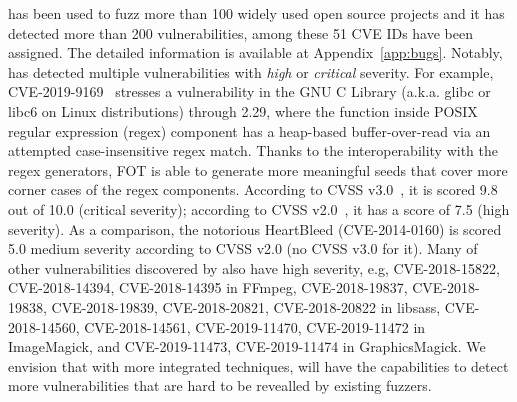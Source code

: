 {\FOT} has been used to fuzz more than 100 widely used open source projects and it has detected more than 200 vulnerabilities, among these 51 CVE IDs have been assigned. The detailed information is available at Appendix~\ref{app:bugs}. Notably, \FOT has detected multiple vulnerabilities with \emph{high} or \emph{critical} severity. For example, CVE-2019-9169~\cite{CVE-2019-9169} stresses a vulnerability in the GNU C Library (a.k.a. glibc or libc6 on Linux distributions) through 2.29, where the function  inside POSIX regular expression (regex) component has a heap-based buffer-over-read via an attempted case-insensitive regex match. Thanks to the interoperability with the regex generators, FOT is able to generate more meaningful seeds that cover more corner cases of the regex components. According to CVSS v3.0~\cite{cvss3}, it is scored 9.8 out of 10.0 (critical severity); according to CVSS v2.0~\cite{cvss2}, it has a score of 7.5 (high severity). As a comparison, the notorious HeartBleed (CVE-2014-0160) is scored 5.0 medium severity according to CVSS v2.0 (no CVSS v3.0 for it). Many of other vulnerabilities discovered by \FOT also have high severity, e.g, CVE-2018-15822, CVE-2018-14394, CVE-2018-14395 in FFmpeg, CVE-2018-19837, CVE-2018-19838, CVE-2018-19839, CVE-2018-20821, CVE-2018-20822 in libsass, CVE-2018-14560, CVE-2018-14561, CVE-2019-11470, CVE-2019-11472 in ImageMagick, and CVE-2019-11473, CVE-2019-11474 in GraphicsMagick. We envision that with more integrated techniques, \FOT will have the capabilities to detect more vulnerabilities that are hard to be revealled by existing fuzzers.
